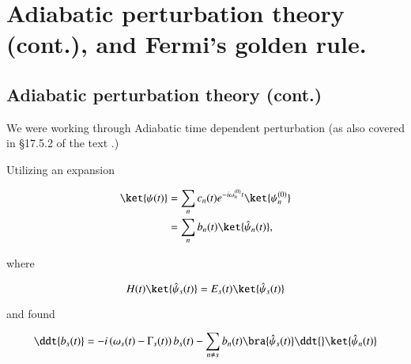 %
%

\chapter{Adiabatic perturbation theory (cont.), and Fermi's golden rule.}
\label{chap:qmTwoL9}
{}
\date{Oct 5, 2011}

\beginArtWithToc

%

\section{Adiabatic perturbation theory (cont.)}

We were working through Adiabatic time dependent perturbation (as also covered in \S 17.5.2 of the text \cite{desai2009quantum}.)

Utilizing an expansion

\begin{align}\label{eqn:qmTwoL9:10}
\ket{\psi(t)} &= \sum_n c_n(t) e^{- i \omega_n^{(0)} t} \ket{\psi_n^{(0)} } \\
&= \sum_n b_n(t) \ket{\hat{\psi}_n(t)},
\end{align}

where

\begin{equation}\label{eqn:qmTwoL9:30}
H(t) \ket{\hat{\psi}_s(t)} = E_s(t) \ket{\hat{\psi}_s(t)} 
\end{equation}

and found

\begin{equation}\label{eqn:qmTwoL9:50}
\ddt{b_s(t)} = 
-i \left( 
\omega_s(t) - \Gamma_s(t)
\right) b_s(t)
- 
\sum_{n \ne s} b_n(t) 
\bra{\hat{\psi}_s(t)}
\ddt{} \ket{\hat{\psi}_n(t)}
\end{equation}

